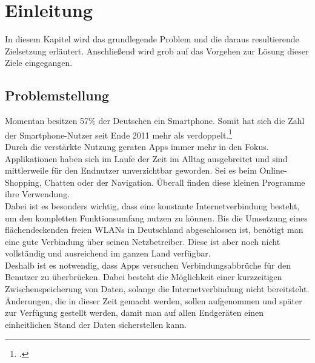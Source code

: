 \chapter{Einleitung}
\label{cha:einleitung}
In diesem Kapitel wird das grundlegende Problem und die daraus resultierende Zielsetzung erläutert. Anschließend wird grob auf das Vorgehen zur Lösung dieser Ziele eingegangen.

\section{Problemstellung}
\label{sec:problemstellung}
Momentan besitzen 57\% der Deutschen ein Smartphone. Somit hat sich die Zahl der Smartphone-Nutzer seit Ende 2011 mehr als verdoppelt.\footcite{Statista-SmartphoneNutzung}\\
Durch die verstärkte Nutzung geraten \glspl{App} immer mehr in den Fokus. Applikationen haben sich im Laufe der Zeit im Alltag ausgebreitet und sind mittlerweile für den Endnutzer unverzichtbar geworden. Sei es beim Online-Shopping, Chatten oder der Navigation. Überall finden diese kleinen Programme ihre Verwendung.\\
Dabei ist es besonders wichtig, dass eine konstante Internetverbindung besteht, um den kompletten Funktionsumfang nutzen zu können. Bis die Umsetzung eines flächendeckenden freien WLANs in Deutschland abgeschlossen ist, benötigt man eine gute Verbindung über seinen Netzbetreiber. Diese ist aber noch nicht vollständig und ausreichend im ganzen Land verfügbar.\\
Deshalb ist es notwendig, dass Apps versuchen Verbindungsabbrüche für den Benutzer zu überbrücken. Dabei besteht die Möglichkeit einer kurzzeitigen Zwischenspeicherung von Daten, solange die Internetverbindung nicht bereitsteht. Änderungen, die in dieser Zeit gemacht werden, sollen aufgenommen und später zur Verfügung gestellt werden, damit man auf allen Endgeräten einen einheitlichen Stand der Daten sicherstellen kann.

